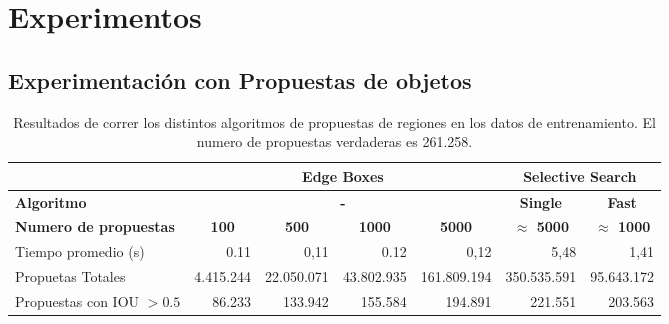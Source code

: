 \chapter{Experimentos}\label{cap:experimentos}

\section{Experimentación con Propuestas de objetos}
\begin{table}[]
	\centering
	\resizebox{12.5cm}{!} {
		\begin{tabular}{|l|c|r|r|r|c|r|}
			\hline
			\textbf{}                     & \multicolumn{4}{c|}{\textbf{Edge Boxes}}                                                                                                   & \multicolumn{2}{c|}{\textbf{Selective Search}}               \\ \hline
			\textbf{Algoritmo}            & \multicolumn{4}{c|}{\textbf{-}}                                                                                                            & \textbf{Single}         & \multicolumn{1}{c|}{\textbf{Fast}} \\ \hline
			\textbf{Numero de propuestas} & \textbf{100}                 & \multicolumn{1}{c|}{\textbf{500}} & \multicolumn{1}{c|}{\textbf{1000}} & \multicolumn{1}{c|}{\textbf{5000}} & \textbf{$\approx$ 5000} & \multicolumn{1}{c|}{\textbf{$\approx$ 1000}}  \\ \hline
			Tiempo promedio (s)           & \multicolumn{1}{r|}{0.11}    & 0,11                              & 0.12                               & 0,12                               & \multicolumn{1}{r|}{5,48}   &         1,41                           \\ \hline
			Propuetas Totales             & \multicolumn{1}{r|}{4.415.244} & 22.050.071                          & 43.802.935                           & 161.809.194                          & \multicolumn{1}{r|}{350.535.591}   &   95.643.172                                 \\ \hline
			Propuestas con IOU $> 0.5$    & \multicolumn{1}{r|}{86.233}   & 133.942                            & 155.584                             & 194.891                             & \multicolumn{1}{r|}{221.551}   & 203.563                                   \\ \hline
		\end{tabular}
	}
	\caption{Resultados de correr los distintos algoritmos de propuestas de regiones en los datos de entrenamiento. El numero de propuestas verdaderas es 261.258.}
	\label{tab:edgeVSselct}
\end{table}

